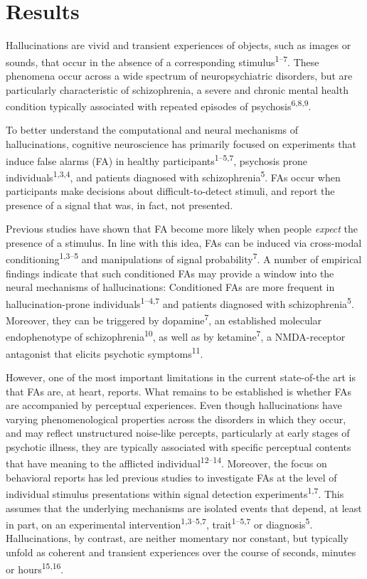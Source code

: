 \documentclass[
]{article}
\begin{document}
\hypertarget{results}{%
\section{Results}\label{results}}

Hallucinations are vivid and transient experiences of objects, such as
images or sounds, that occur in the absence of a corresponding
stimulus\textsuperscript{1--7}. These phenomena occur across a wide
spectrum of neuropsychiatric disorders, but are particularly
characteristic of schizophrenia, a severe and chronic mental health
condition typically associated with repeated episodes of
psychosis\textsuperscript{6,8,9}.

To better understand the computational and neural mechanisms of
hallucinations, cognitive neuroscience has primarily focused on
experiments that induce false alarms (FA) in healthy
participants\textsuperscript{1--5,7}, psychosis prone
individuals\textsuperscript{1,3,4}, and patients diagnosed with
schizophrenia\textsuperscript{5}. FAs occur when participants make
decisions about difficult-to-detect stimuli, and report the presence of
a signal that was, in fact, not presented.

Previous studies have shown that FA become more likely when people
\emph{expect} the presence of a stimulus. In line with this idea, FAs
can be induced via cross-modal conditioning\textsuperscript{1,3--5} and
manipulations of signal probability\textsuperscript{7}. A number of
empirical findings indicate that such conditioned FAs may provide a
window into the neural mechanisms of hallucinations: Conditioned FAs are
more frequent in hallucination-prone individuals\textsuperscript{1--4,7}
and patients diagnosed with schizophrenia\textsuperscript{5}. Moreover,
they can be triggered by dopamine\textsuperscript{7}, an established
molecular endophenotype of schizophrenia\textsuperscript{10}, as well as
by ketamine\textsuperscript{7}, a NMDA-receptor antagonist that elicits
psychotic symptoms\textsuperscript{11}.

However, one of the most important limitations in the current
state-of-the art is that FAs are, at heart, reports. What remains to be
established is whether FAs are accompanied by perceptual experiences.
Even though hallucinations have varying phenomenological properties
across the disorders in which they occur, and may reflect unstructured
noise-like percepts, particularly at early stages of psychotic illness,
they are typically associated with specific perceptual contents that
have meaning to the afflicted individual\textsuperscript{12--14}.
Moreover, the focus on behavioral reports has led previous studies to
investigate FAs at the level of individual stimulus presentations within
signal detection experiments\textsuperscript{1,7}. This assumes that the
underlying mechanisms are isolated events that depend, at least in part,
on an experimental intervention\textsuperscript{1,3--5,7},
trait\textsuperscript{1--5,7} or diagnosis\textsuperscript{5}.
Hallucinations, by contrast, are neither momentary nor constant, but
typically unfold as coherent and transient experiences over the course
of seconds, minutes or hours\textsuperscript{15,16}.
\end{document}
